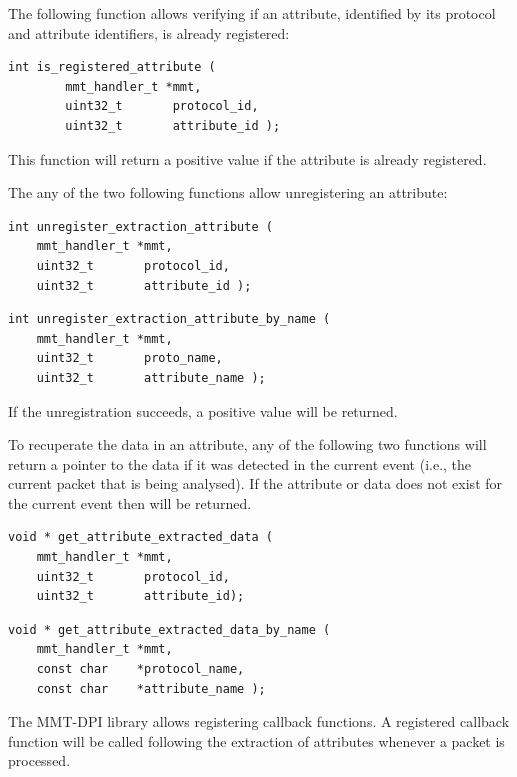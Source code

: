 The following function allows verifying if an attribute, identified by its protocol and attribute identifiers, is already registered:

\begin{lstlisting}[style=Cpp]
int is_registered_attribute (
        mmt_handler_t *mmt,
        uint32_t       protocol_id,
        uint32_t       attribute_id );
\end{lstlisting}

This function will return a positive value if the attribute is already registered.


The any of the two following functions allow unregistering an attribute:

\begin{lstlisting}[style=Cpp]
int unregister_extraction_attribute (
    mmt_handler_t *mmt,
    uint32_t       protocol_id,
    uint32_t       attribute_id );
\end{lstlisting}

\begin{lstlisting}[style=Cpp]
int unregister_extraction_attribute_by_name (
    mmt_handler_t *mmt,
    uint32_t       proto_name,
    uint32_t       attribute_name );
\end{lstlisting}

If the unregistration succeeds, a positive value will be returned.

To recuperate the data in an attribute, any of the following two functions will return a pointer to the data if it was detected in the current event (i.e., the current packet that is being analysed). If the attribute or data does not exist for the current event then  will be returned.

\begin{lstlisting}[style=Cpp]
void * get_attribute_extracted_data (
    mmt_handler_t *mmt,
    uint32_t       protocol_id,
    uint32_t       attribute_id);
\end{lstlisting}

\begin{lstlisting}[style=Cpp]
void * get_attribute_extracted_data_by_name (
    mmt_handler_t *mmt,
    const char    *protocol_name,
    const char    *attribute_name );
\end{lstlisting} 

The MMT-DPI library allows registering callback functions. A registered callback function will be called following the extraction of attributes whenever a packet is processed. 


